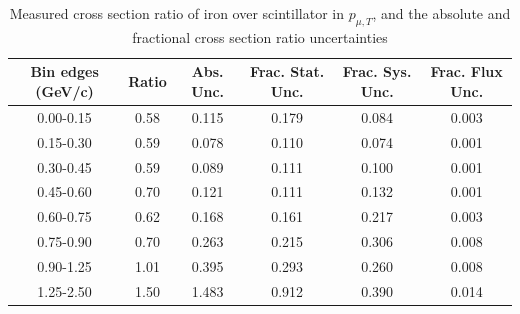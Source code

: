 \documentclass[../main.tex]{subfiles}
\begin{document}
\begin{table}
  \centering
  \renewcommand{\arraystretch}{1.15}
  \caption{Systematic covariance matrix of measured cross section ratio of iron over scintillator in $p_{\mu,||}$}
  \label{tbl:rationucleonnuc26muon_pzc}
\end{table}
\begin{table}
  \centering
  \renewcommand{\arraystretch}{1.15}
  \caption{Measured cross section ratio of iron over scintillator in $p_{\mu,T}$, and the absolute and fractional cross section ratio uncertainties}
    \begin{tabular}{c||c|c||c|c|c}
      Bin edges (GeV/c) &  Ratio  &  Abs. Unc.  &  Frac. Stat. Unc.  &  Frac. Sys. Unc.  &  Frac. Flux Unc. \\
      \hline
      \hline
      0.00-0.15 & 0.58 & 0.115 & 0.179 & 0.084 & 0.003\\
      0.15-0.30 & 0.59 & 0.078 & 0.110 & 0.074 & 0.001\\
      0.30-0.45 & 0.59 & 0.089 & 0.111 & 0.100 & 0.001\\
      0.45-0.60 & 0.70 & 0.121 & 0.111 & 0.132 & 0.001\\
      0.60-0.75 & 0.62 & 0.168 & 0.161 & 0.217 & 0.003\\
      0.75-0.90 & 0.70 & 0.263 & 0.215 & 0.306 & 0.008\\
      0.90-1.25 & 1.01 & 0.395 & 0.293 & 0.260 & 0.008\\
      1.25-2.50 & 1.50 & 1.483 & 0.912 & 0.390 & 0.014
    \end{tabular}
  \label{tbl:rationucleonnuc26muon_pta}
\end{table}
\end{document}
